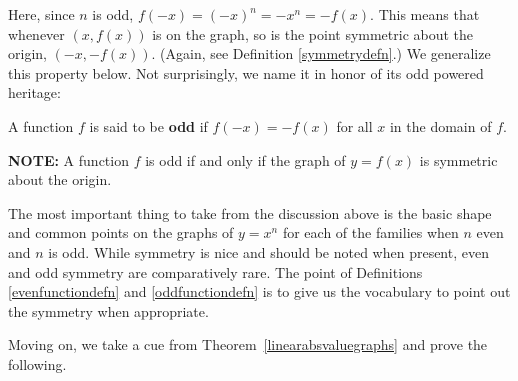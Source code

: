 \documentclass{ximera}
\begin{document}

Here, since $n$ is odd,  $f(-x) = (-x)^n = -x^n = -f(x)$.  This means that whenever $(x, f(x))$ is on the graph, so is the point symmetric about the origin,  $(-x, -f(x))$. (Again, see Definition \ref{symmetrydefn}.) We generalize this property below.  Not surprisingly, we name it in honor of its odd powered heritage:



\begin{definition} \label{oddfunctiondefn} A function $f$ is said to be \textbf{odd} if $f(-x) = -f(x)$ for all $x$ in the domain of $f$.  

\textbf{NOTE:} A function $f$ is odd if and only if  the graph of  $y = f(x)$ is symmetric about the origin.

\end{definition}



The most important thing to take from the discussion above is the basic shape and common points on the graphs of $y = x^n$ for each of the families when $n$ even and $n$ is odd.  While symmetry is nice and should be noted when present, even and odd symmetry are comparatively rare.  The point of Definitions \ref{evenfunctiondefn}  and \ref{oddfunctiondefn} is to give us the vocabulary to point out the symmetry when appropriate.  


Moving on, we take a cue from Theorem~\ref{linearabsvaluegraphs} and prove the following.


\end{document}
